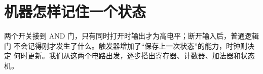\chapter{机器怎样记住一个状态}

两个开关接到 AND 门，只有同时打开时输出才为高电平；断开输入后，普通逻辑门
不会记得刚才发生了什么。触发器增加了“保存上一次状态”的能力，时钟则决定
何时更新。我们从这两个电路出发，逐步搭出寄存器、计数器、加法器和状态机。



